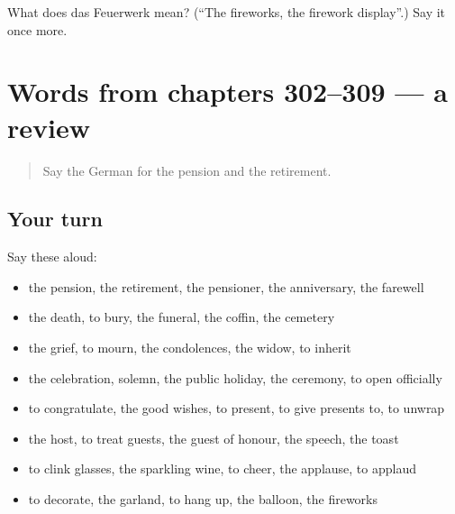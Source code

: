 \begin{tcolorbox}[breakable,colback=teal!4,colframe=teal!35!black,title={Before you move on}]
What does das Feuerwerk mean? (\textquotedblleft{}The fireworks, the firework display\textquotedblright{}.) Say it once more.
\end{tcolorbox}
\section[(dialogue)]{Words from chapters 302–309 — a review}

\label{lesson:GE-R309-review-302-309}



\begin{quote}
Say the German for the pension and the retirement.
\end{quote}

\subsection*{Your turn}
Say these aloud:

\begin{itemize}
\raggedright
  \item the pension, the retirement, the pensioner, the anniversary, the farewell
  \item the death, to bury, the funeral, the coffin, the cemetery
  \item the grief, to mourn, the condolences, the widow, to inherit
  \item the celebration, solemn, the public holiday, the ceremony, to open officially
  \item to congratulate, the good wishes, to present, to give presents to, to unwrap
  \item the host, to treat guests, the guest of honour, the speech, the toast
  \item to clink glasses, the sparkling wine, to cheer, the applause, to applaud
  \item to decorate, the garland, to hang up, the balloon, the fireworks
\end{itemize}

